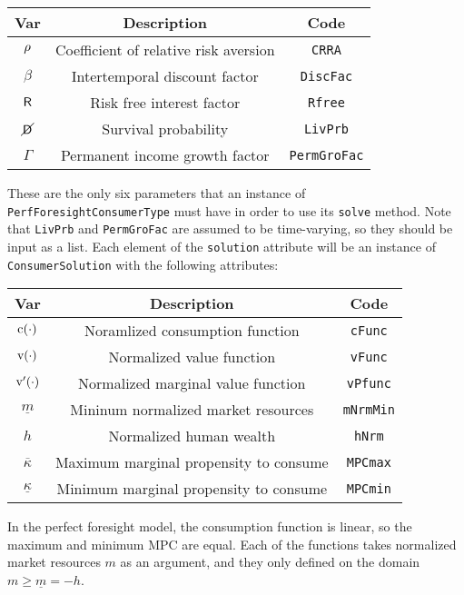 \documentclass[12pt,titlepage,letterpaper]{econtex}
\begin{document}
\begin{table}[h!]
\centering
\begin{tabular}{c c c}
Var & Description & Code \\
\hline
$\rho$ & Coefficient of relative risk aversion & \texttt{CRRA} \\
$\beta$ & Intertemporal discount factor & \texttt{DiscFac} \\
$\mathsf{R}$ & Risk free interest factor & \texttt{Rfree} \\
$\cancel{\mathsf{D}}$ & Survival probability & \texttt{LivPrb} \\
$\Gamma$ & Permanent income growth factor & \texttt{PermGroFac}
\end{tabular}
\end{table}

These are the only six parameters that an instance of \texttt{PerfForesightConsumerType} must have in order to use its \texttt{solve} method.  Note that \texttt{LivPrb} and \texttt{PermGroFac} are assumed to be time-varying, so they should be input as a list.  Each element of the \texttt{solution} attribute will be an instance of \texttt{ConsumerSolution} with the following attributes:

\begin{table}[h!]
\centering
\begin{tabular}{c c c}
Var & Description & Code \\
\hline
$\mathrm{c}(\cdot)$ & Noramlized consumption function & \texttt{cFunc} \\
$\mathrm{v}(\cdot)$ & Normalized value function & \texttt{vFunc} \\
$\mathrm{v}'(\cdot)$ & Normalized marginal value function & \texttt{vPfunc} \\
$\underline{m}$ & Mininum normalized market resources & \texttt{mNrmMin} \\
$h$ & Normalized human wealth & \texttt{hNrm} \\
$\overline{\kappa}$ & Maximum marginal propensity to consume & \texttt{MPCmax} \\
$\underline{\kappa}$ & Minimum marginal propensity to consume & \texttt{MPCmin} \\
\end{tabular}
\end{table}
In the perfect foresight model, the consumption function is linear, so the maximum and minimum MPC are equal.  Each of the functions takes normalized market resources $m$ as an argument, and they only defined on the domain $m \geq \underline{m} = -h$.
\end{document}

